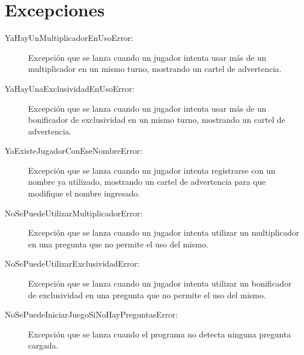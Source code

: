 \documentclass[titlepage,a4paper]{article}
\begin{document}
\section{Excepciones}\label{sec:excepciones}

\begin{description}
\item[YaHayUnMultiplicadorEnUsoError:] Excepción que se lanza cuando un jugador intenta usar más de un multiplicador en un mismo turno, mostrando un cartel de advertencia.

\end{description}

\begin{description}
\item[YaHayUnaExclusividadEnUsoError:] Excepción que se lanza cuando un jugador intenta usar más de un bonificador de exclusividad en un mismo turno, mostrando un cartel de advertencia.

\end{description}

\begin{description}
\item[YaExisteJugadorConEseNombreError:] Excepción que se lanza cuando un jugador intenta registrarse con un nombre ya utilizado, mostrando un cartel de advertencia para que modifique el nombre ingresado.

\end{description}

\begin{description}
\item[NoSePuedeUtilizarMultiplicadorError:] Excepción que se lanza cuando un jugador intenta utilizar un multiplicador en una pregunta que no permite el uso del mismo.

\end{description}

\begin{description}
\item[NoSePuedeUtilizarExclusividadError:] Excepción que se lanza cuando un jugador intenta utilizar un bonificador de exclusividad en una pregunta que no permite el uso del mismo.

\end{description}

\begin{description}
\item[NoSePuedeIniciarJuegoSiNoHayPreguntasError:] Excepción que se lanza cuando el programa no detecta ninguna pregunta cargada.

\end{description}
\end{document}
